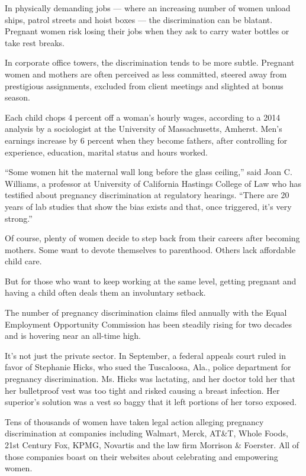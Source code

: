 In physically demanding jobs --- where an increasing number of women
unload ships, patrol streets and hoist boxes --- the discrimination can
be blatant. Pregnant women risk losing their jobs when they ask to carry
water bottles or take rest breaks.

In corporate office towers, the discrimination tends to be more subtle.
Pregnant women and mothers are often perceived as less committed,
steered away from prestigious assignments, excluded from client meetings
and slighted at bonus season.

Each child chops 4 percent off a woman's hourly wages, according to a
2014 analysis by a sociologist at the University of Massachusetts,
Amherst. Men's earnings increase by 6 percent when they become fathers,
after controlling for experience, education, marital status and hours
worked.

``Some women hit the maternal wall long before the glass ceiling,'' said
Joan C. Williams, a professor at University of California Hastings
College of Law who has testified about pregnancy discrimination at
regulatory hearings. ``There are 20 years of lab studies that show the
bias exists and that, once triggered, it's very strong.''

Of course, plenty of women decide to step back from their careers after
becoming mothers. Some want to devote themselves to parenthood. Others
lack affordable child care.

But for those who want to keep working at the same level, getting
pregnant and having a child often deals them an involuntary setback.

The number of pregnancy discrimination claims filed annually with the
Equal Employment Opportunity Commission has been steadily rising for two
decades and is hovering near an all-time high.

It's not just the private sector. In September, a federal appeals court
ruled in favor of Stephanie Hicks, who sued the Tuscaloosa, Ala., police
department for pregnancy discrimination. Ms. Hicks was lactating, and
her doctor told her that her bulletproof vest was too tight and risked
causing a breast infection. Her superior's solution was a vest so baggy
that it left portions of her torso exposed.

Tens of thousands of women have taken legal action alleging pregnancy
discrimination at companies including Walmart, Merck, AT\&T, Whole
Foods, 21st Century Fox, KPMG, Novartis and the law firm Morrison \&
Foerster. All of those companies boast on their websites about
celebrating and empowering women.

